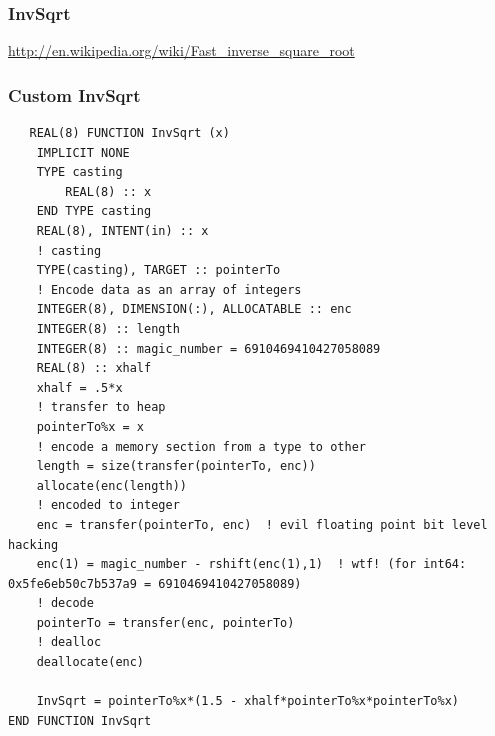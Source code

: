 \documentclass{beamer}
\begin{document}
\begin{frame}
 \frametitle{InvSqrt}
 \url{http://en.wikipedia.org/wiki/Fast_inverse_square_root}
\end{frame}
\begin{frame}[fragile]
 \frametitle{Custom InvSqrt}
  \begin{lstlisting}
   REAL(8) FUNCTION InvSqrt (x)
    IMPLICIT NONE
    TYPE casting
        REAL(8) :: x
    END TYPE casting
    REAL(8), INTENT(in) :: x
    ! casting
    TYPE(casting), TARGET :: pointerTo
    ! Encode data as an array of integers
    INTEGER(8), DIMENSION(:), ALLOCATABLE :: enc
    INTEGER(8) :: length
    INTEGER(8) :: magic_number = 6910469410427058089
    REAL(8) :: xhalf
    xhalf = .5*x
    ! transfer to heap
    pointerTo%x = x
    ! encode a memory section from a type to other
    length = size(transfer(pointerTo, enc))
    allocate(enc(length))
    ! encoded to integer
    enc = transfer(pointerTo, enc)  ! evil floating point bit level hacking
    enc(1) = magic_number - rshift(enc(1),1)  ! wtf! (for int64: 0x5fe6eb50c7b537a9 = 6910469410427058089)
    ! decode
    pointerTo = transfer(enc, pointerTo)
    ! dealloc
    deallocate(enc)

    InvSqrt = pointerTo%x*(1.5 - xhalf*pointerTo%x*pointerTo%x)
END FUNCTION InvSqrt
  \end{lstlisting}

\end{frame}
\end{document}

